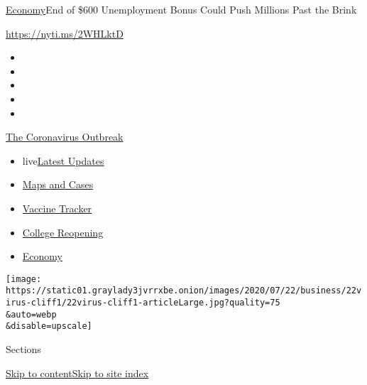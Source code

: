 \href{/section/business/economy}{Economy}\textbar{}End of \$600
Unemployment Bonus Could Push Millions Past the Brink

\url{https://nyti.ms/2WHLktD}

\begin{itemize}
\item
\item
\item
\item
\item
\end{itemize}

\href{https://www.nytimes3xbfgragh.onion/news-event/coronavirus?action=click\&pgtype=Article\&state=default\&region=TOP_BANNER\&context=storylines_menu}{The
Coronavirus Outbreak}

\begin{itemize}
\tightlist
\item
  live\href{https://www.nytimes3xbfgragh.onion/2020/08/04/world/coronavirus-cases.html?action=click\&pgtype=Article\&state=default\&region=TOP_BANNER\&context=storylines_menu}{Latest
  Updates}
\item
  \href{https://www.nytimes3xbfgragh.onion/interactive/2020/us/coronavirus-us-cases.html?action=click\&pgtype=Article\&state=default\&region=TOP_BANNER\&context=storylines_menu}{Maps
  and Cases}
\item
  \href{https://www.nytimes3xbfgragh.onion/interactive/2020/science/coronavirus-vaccine-tracker.html?action=click\&pgtype=Article\&state=default\&region=TOP_BANNER\&context=storylines_menu}{Vaccine
  Tracker}
\item
  \href{https://www.nytimes3xbfgragh.onion/2020/08/02/us/covid-college-reopening.html?action=click\&pgtype=Article\&state=default\&region=TOP_BANNER\&context=storylines_menu}{College
  Reopening}
\item
  \href{https://www.nytimes3xbfgragh.onion/live/2020/08/04/business/stock-market-today-coronavirus?action=click\&pgtype=Article\&state=default\&region=TOP_BANNER\&context=storylines_menu}{Economy}
\end{itemize}

\texttt{[image: https://static01.graylady3jvrrxbe.onion/images/2020/07/22/business/22virus-cliff1/22virus-cliff1-articleLarge.jpg?quality=75\\\&auto=webp\\\&disable=upscale]}

Sections

\protect\hyperlink{site-content}{Skip to
content}\protect\hyperlink{site-index}{Skip to site index}

